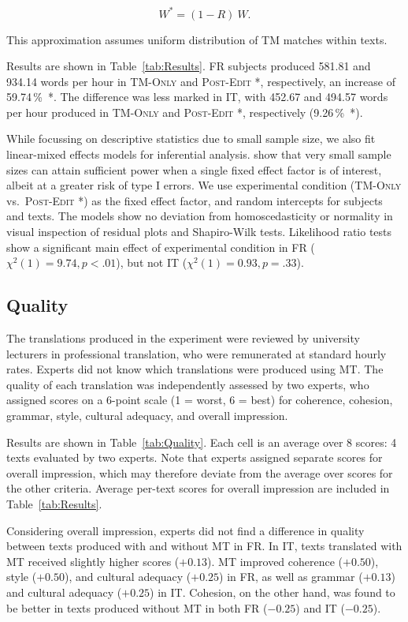 \documentclass[11pt]{article}
\newcommand{\Appendix}[1]{Appendix~\ref{sec:#1}}
\newcommand{\Table}[1]{Table~\ref{tab:#1}}
\newcommand{\percent}{\,\%\ }
\newcommand{\tm}{\textsc{TM-Only} }
\newcommand{\pe}{\textsc{Post-Edit} }
\begin{document}
\begin{equation}
    W^{*} = (1-R)~W.
\end{equation}

\noindent This approximation assumes uniform distribution of TM matches within texts.

Results are shown in \Table{Results}. FR subjects produced 581.81 and 934.14 words per hour in \tm and \pe*, respectively, an increase of 59.74\percent*. The difference was less marked in IT, with 452.67 and 494.57 words per hour produced in \tm and \pe*, respectively (9.26\percent*).

While focussing on descriptive statistics due to small sample size, we also fit linear-mixed effects models for inferential analysis. \citet{CarterWojton2018} show that very small sample sizes can attain sufficient power when a single fixed effect factor is of interest, albeit at a greater risk of type I errors. We use experimental condition (\tm vs.\ \pe*) as the fixed effect factor, and random intercepts for subjects and texts. The models show no deviation from homoscedasticity or normality in visual inspection of residual plots and Shapiro-Wilk tests. Likelihood ratio tests show a significant main effect of experimental condition in FR ($\chi^2(1)=9.74, p<.01$), but not IT ($\chi^2(1)=0.93, p=.33$).

\subsection{Quality}
\label{sec:Quality}

The translations produced in the experiment were reviewed by university lecturers in professional translation, who were remunerated at standard hourly rates. Experts did not know which translations were produced using MT. The quality of each translation was independently assessed by two experts, who assigned scores on a 6-point scale (1 = worst, 6 = best) for coherence, cohesion, grammar, style, cultural adequacy, and overall impression. 

Results are shown in \Table{Quality}. Each cell is an average over 8 scores: 4 texts evaluated by two experts. Note that experts assigned separate scores for overall impression, which may therefore deviate from the average over scores for the other criteria. Average per-text scores for overall impression are included in \Table{Results}.

Considering overall impression, experts did not find a difference in quality between texts produced with and without MT in FR. In IT, texts translated with MT received slightly higher scores ($+0.13$). MT improved coherence ($+0.50$), style ($+0.50$), and cultural adequacy ($+0.25$) in FR, as well as grammar ($+0.13$) and cultural adequacy ($+0.25$) in IT. Cohesion, on the other hand, was found to be better in texts produced without MT in both FR ($-0.25$) and IT ($-0.25$).
\end{document}
